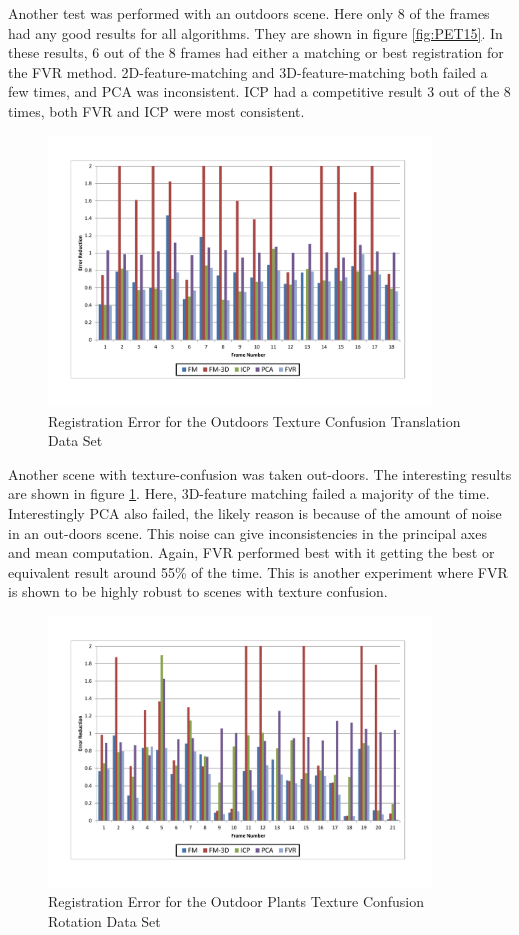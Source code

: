 Another test was performed with an outdoors scene. Here only 8 of the frames had any good results for all algorithms. They are shown in figure \ref{fig:PET15}. In these results, 6 out of the 8 frames had either a matching or best registration for the FVR method. 2D-feature-matching and 3D-feature-matching both failed a few times, and PCA was inconsistent. ICP had a competitive result 3 out of the 8 times, both FVR and ICP were most consistent. 

\begin{figure}[!htb]
\centering
\includegraphics[width=4.0in]{images/results/Outside_TextureConfusion_Translation}
\caption{Registration Error for the Outdoors Texture Confusion Translation Data Set}
\label{fig:PET16}
\end{figure}

Another scene with texture-confusion was taken out-doors. The interesting results are shown in figure \ref{fig:PET16}. Here, 3D-feature matching failed a majority of the time. Interestingly PCA also failed, the likely reason is because of the amount of noise in an out-doors scene. This noise can give inconsistencies in the principal axes and mean computation. Again, FVR performed best with it getting the best or equivalent result around 55\% of the time. This is another experiment where FVR is shown to be highly robust to scenes with texture confusion. 

\begin{figure}[!htb]
\centering
\includegraphics[width=4.0in]{images/results/Plants_Outdoors_Texture_Confusion_Rotation}
\caption{Registration Error for the Outdoor Plants Texture Confusion Rotation Data Set}
\label{fig:PET17}
\end{figure}

